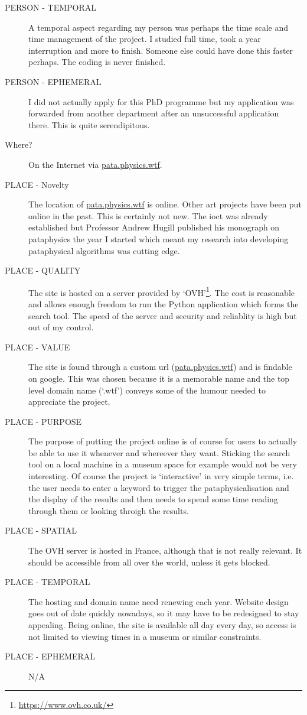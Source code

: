 \begin{description}
  \item[PERSON - TEMPORAL] A temporal aspect regarding my person was perhaps the time scale and time management of the project. I studied full time, took a year interruption and more to finish.  Someone else could have done this faster perhaps. The coding is never finished.
  \item[PERSON - EPHEMERAL] I did not actually apply for this PhD programme but my application was forwarded from another department after an unsuccessful application there. This is quite serendipitous.
\end{description}

\spirals

\begin{description}
  \item[Where?] On the Internet via \url{pata.physics.wtf}.
  \item[PLACE - Novelty] The location of \url{pata.physics.wtf} is online. Other art projects have been put online in the past. This is certainly not new. The \gls{ioct} was already established but Professor Andrew Hugill published his monograph on pataphysics the year I started which meant my research into developing pataphysical algorithms was cutting edge.  
  \item[PLACE - QUALITY] The site is hosted on a server provided by `OVH'\footnote{\url{https://www.ovh.co.uk/}}. The cost is reasonable and allows enough freedom to run the Python application which forms the search tool. The speed of the server and security and reliablity is high but out of my control.
  \item[PLACE - VALUE] The site is found through a custom \gls{url} (\url{pata.physics.wtf}) and is findable on google. This was chosen because it is a memorable name and the top level domain name (`.wtf') conveys some of the humour needed to appreciate the project.
  \item[PLACE - PURPOSE] The purpose of putting the project online is of course for users to actually be able to use it whenever and whereever they want. Sticking the search tool on a local machine in a museum space for example would not be very interesting. Of course the project is `interactive' in very simple terms, i.e. the user needs to enter a keyword to trigger the pataphysicalisation and the display of the results and then needs to spend some time reading through them or looking throigh the results.
  \item[PLACE - SPATIAL] The OVH server is hosted in France, although that is not really relevant. It should be accessible from all over the world, unless it gets blocked.
  \item[PLACE - TEMPORAL] The hosting and domain name need renewing each year. Website design goes out of date quickly nowadays, so it may have to be redesigned to stay appealing. Being online, the site is available all day every day, so access is not limited to viewing times in a museum or similar constraints.
  \item[PLACE - EPHEMERAL] N/A
\end{description}

